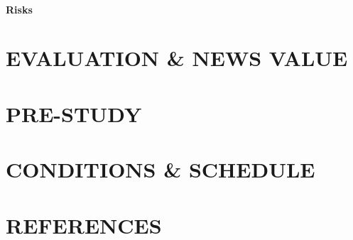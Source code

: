 \documentclass{article}
\begin{document}
\paragraph{Risks}

\section*{EVALUATION \& NEWS VALUE}


\section*{PRE-STUDY}

\section*{CONDITIONS \& SCHEDULE}



\section*{REFERENCES}


\end{document}

